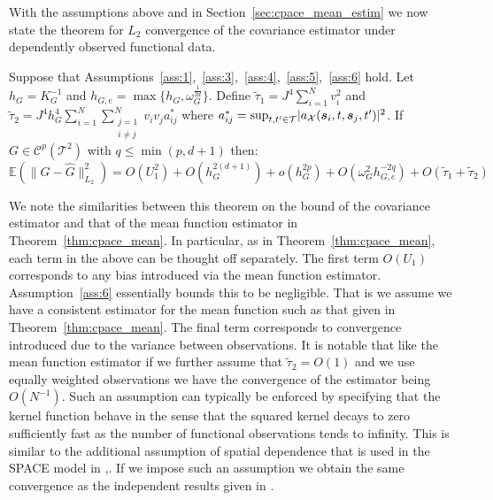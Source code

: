 With the assumptions above and in Section~\ref{sec:cpace_mean_estim} we now state the theorem for $L_2$ convergence of the covariance estimator under dependently observed functional data.

\begin{theorem}
	Suppose that Assumptions~\ref{ass:1},~\ref{ass:3},~\ref{ass:4},~\ref{ass:5},~\ref{ass:6} hold. 
	Let $h_G = K_G^{-1}$ and $h_{G,e} = \max\{h_{G}, \omega_G^{\frac{1}{2d}}\}$.
	Define $\tilde{\tau}_1 = J^4 \sum_{i=1}^N v_i^2$ and $\tilde{\tau}_2 =J^4 h_G^4 \sum_{i=1}^N \sum_{\substack{j=1 \\ i \ne j}}^N v_i v_j a_{ij}^* $ where $a_{ij}^* = \sup_{t, t^\prime \in \mathcal{T}} \lvert a_\mathcal{X}(\bm{{s}}_{i}, t, \bm{{s}}_{j}, t^\prime) \rvert^2$. 
	If $G \in \mathcal{C}^p\left(\mathcal{T}^2\right)$ with $q \le \min(p, d+1)$ then:
	\begin{equation}
		\mathbb{E}\left(\lVert G - \hat{G} \rVert_{L_2}^2\right) = O(U_1^2) + O(h_G^{2(d+1)}) + o(h_G^{2p}) + O(\omega_G^2 h_{G,e}^{-2q}) + O(\tilde{\tau}_1 + \tilde{\tau}_2)
	\end{equation}
\label{thm:cpace_cov}
\end{theorem}

We note the similarities between this theorem on the bound of the covariance estimator and that of the mean function estimator in Theorem~\ref{thm:cpace_mean}.
In particular, as in Theorem~\ref{thm:cpace_mean}, each term in the above can be thought off separately. 
The first term $O(U_1)$ corresponds to any bias introduced via the mean function estimator.
Assumption~\ref{ass:6} essentially bounds this to be negligible.
That is we assume we have a consistent estimator for the mean function such as that given in Theorem~\ref{thm:cpace_mean}.
The final term corresponds to convergence introduced due to the variance between observations. 
It is notable that like the mean function estimator if we further assume that $\tilde{\tau}_2 = O(1)$ and we use equally weighted observations we have the convergence of the estimator being $O(N^{-1})$.
Such an assumption can typically be enforced by specifying that the kernel function behave in the sense that the squared kernel decays to zero sufficiently fast as the number of functional observations tends to infinity.
This is similar to the additional assumption of spatial dependence that is used in the SPACE model in ,\citep{liu_functional_2017}.
If we impose such an assumption we obtain the same convergence as the independent results given in \citep{xiao_asymptotic_2020}.


